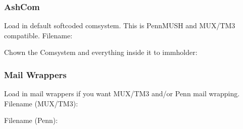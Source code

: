 \documentclass[letterpaper,10pt,english]{sphinxmanual}
\begin{document}
\subsubsection{AshCom}
\label{\detokenize{gettingstarted:ashcom}}
\sphinxAtStartPar
Load in default softcoded comsystem.  This is PennMUSH and MUX/TM3 compatible.
Filename:

\begin{sphinxVerbatim}[commandchars=\\\{\}]
\end{sphinxVerbatim}

\sphinxAtStartPar
Chown the Comsystem and everything inside it to immholder:

\begin{sphinxVerbatim}[commandchars=\\\{\}]
 
  
 
\end{sphinxVerbatim}


\subsubsection{Mail Wrappers}
\label{\detokenize{gettingstarted:mail-wrappers}}
\sphinxAtStartPar
Load in mail wrappers if you want MUX/TM3 and/or Penn mail wrapping.
Filename (MUX/TM3):

\begin{sphinxVerbatim}[commandchars=\\\{\}]
\end{sphinxVerbatim}

\sphinxAtStartPar
Filename (Penn):

\begin{sphinxVerbatim}[commandchars=\\\{\}]
\end{sphinxVerbatim}
\end{document}
